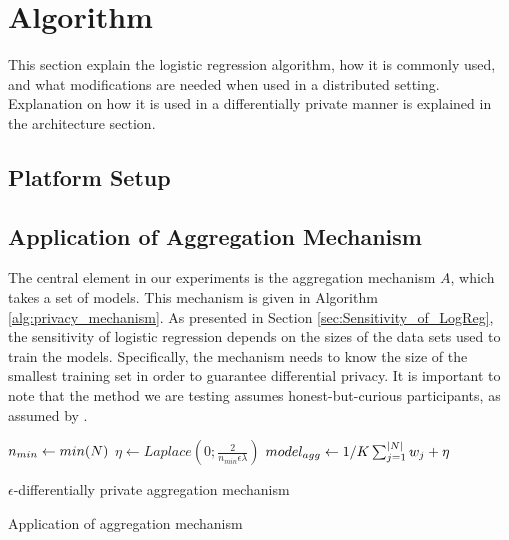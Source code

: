 \section{Algorithm}

This section explain the logistic regression algorithm, how it is commonly used, and what modifications are needed when used in a distributed setting. Explanation on how it is used in a differentially private manner is explained in the architecture section. 

\subsection{Platform Setup}

\subsection{Application of Aggregation Mechanism}

The central element in our experiments is the aggregation mechanism $A$, which takes a set of models. This mechanism is given in Algorithm \ref{alg:privacy_mechanism}. As presented in Section \ref{sec:Sensitivity_of_LogReg}, the sensitivity of logistic regression depends on the sizes of the data sets used to train the models. Specifically, the mechanism needs to know the size of the smallest training set in order to guarantee differential privacy. It is important to note that the method we are testing assumes honest-but-curious participants, as assumed by \cite{pathak2010diffprivhomo}.

\begin{algorithm}[H]
	\label{alg:privacy_mechanism}
		$n_{min} \leftarrow min(\boldmath{N})$\;
		$\eta \leftarrow Laplace(0; \frac{2}{n_{min}\epsilon\lambda})$\;
		$model_{agg} \leftarrow 1/K\sum_{j=1}^{|\boldmath{N}|} \boldmath{w_j} + \boldmath{\eta}$\;
		
\caption{$\epsilon$-differentially private aggregation mechanism}
\end{algorithm}


\begin{algorithm}[H]
\caption{Application of aggregation mechanism}
\end{algorithm}

